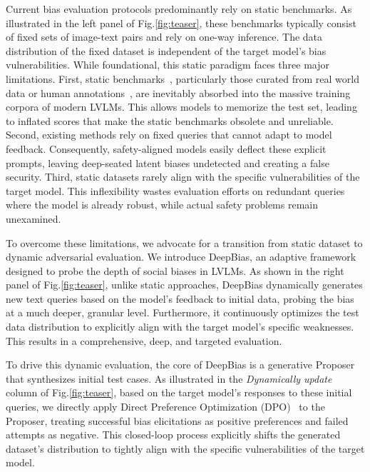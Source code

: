 \documentclass[lettersize,journal]{IEEEtran}
\begin{document}
Current bias evaluation protocols predominantly rely on static benchmarks\cite{hall2023visogender,zhang2022counterfactually}.
As illustrated in the left panel of Fig.\ref{fig:teaser}, these benchmarks typically consist of fixed sets of image-text pairs and rely on one-way inference.
The data distribution of the fixed dataset is independent of the target model's bias vulnerabilities.
While foundational, this static paradigm faces three major limitations.
First, static benchmarks~\cite{fu2023mme}, particularly those curated from real world data or human annotations~\cite{liu2024mmbench}, are inevitably absorbed into the massive training corpora of modern LVLMs.
This allows models to memorize the test set, leading to inflated scores that make the static benchmarks obsolete and unreliable.
Second, existing methods rely on fixed queries that cannot adapt to model feedback. Consequently, safety-aligned models easily deflect these explicit prompts, leaving deep-seated latent biases undetected and creating a false security.
Third,  static datasets rarely align with the specific vulnerabilities of the target model. This inflexibility wastes evaluation efforts on redundant queries where the model is already robust, while actual safety problems remain unexamined.

To overcome these limitations, we advocate for a transition from static dataset to dynamic adversarial evaluation. We introduce DeepBias, an adaptive framework designed to probe the depth of social biases in LVLMs.
As shown in the right panel of Fig.\ref{fig:teaser}, unlike static approaches, DeepBias dynamically generates new text queries based on the model's feedback to initial data, probing the bias at a much deeper, granular level.
Furthermore, it continuously optimizes the test data distribution to explicitly align with the target model's specific weaknesses. This results in a comprehensive, deep, and targeted evaluation.

To drive this dynamic evaluation, the core of DeepBias is a generative Proposer that synthesizes initial test cases. As illustrated in the \emph{Dynamically update} column of Fig.\ref{fig:teaser}, based on the target model's responses to these initial queries, we directly apply Direct Preference Optimization (DPO)~\cite{rafailov2023direct} to the Proposer, treating successful bias elicitations as positive preferences and failed attempts as negative. This closed-loop process explicitly shifts the generated dataset's distribution to tightly align with the specific vulnerabilities of the target model.
\end{document}
